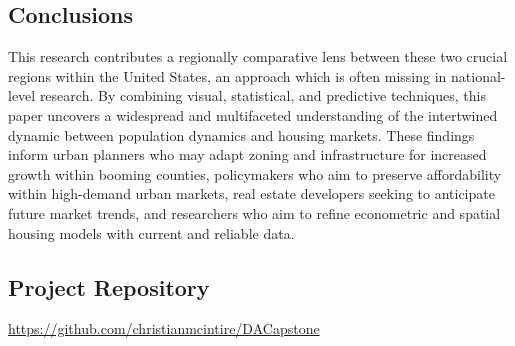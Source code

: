 \documentclass[journal,article,submit,pdftex,moreauthors]{Definitions/mdpi}
\begin{document}
\subsection{Conclusions}

This research contributes a regionally comparative lens between these two crucial regions within the United States, an approach which is often missing in national-level research. By combining visual, statistical, and predictive techniques, this paper uncovers a widespread and multifaceted understanding of the intertwined dynamic between population dynamics and housing markets. These findings inform urban planners who may adapt zoning and infrastructure for increased growth within booming counties, policymakers who aim to preserve affordability within high-demand urban markets, real estate developers seeking to anticipate future market trends, and researchers who aim to refine econometric and spatial housing models with current and reliable data.

\subsection{Project Repository}
\noindent\url{https://github.com/christianmcintire/DACapstone}

\end{document}
